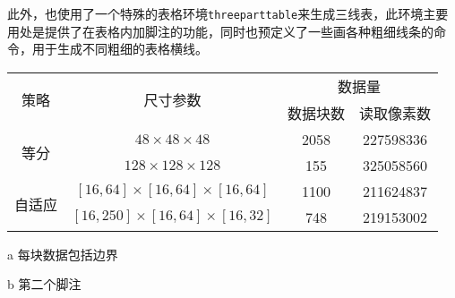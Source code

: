 此外，也使用了一个特殊的表格环境\texttt{threeparttable}来生成三线表，此环境主要用处是提供了在表格内加脚注的功能，同时也预定义了一些画各种粗细线条的命令，用于生成不同粗细的表格横线。

\begin{table}[htbp]
\centering
  \begin{threeparttable}
    \newcommand{\chengs}{\ensuremath{\times}}
    \newcommand{\cheng}{\ensuremath{\!\times\!}}
    \label{tab:samples:threepart}
    \begin{tabular}{cccc} %
      \toprule
  \multirow{2}{*}{策略}   & \multirow{2}{*}{尺寸参数}             & \multicolumn{2}{c}{数据量}    \tabularnewline \cmidrule{3-4}
                         &                                      & 数据块数\tnote{a} & 读取像素数\tnote{b} \tabularnewline \midrule
  \multirow{2}{*}{等分}   & $48\chengs 48\chengs 48$             & 2058             & 227598336 \tabularnewline \cmidrule{2-4} %
                         & $128\chengs 128\chengs 128$          & 155              & 325058560 \tabularnewline \midrule
  \multirow{2}{*}{自适应} & $[16,64]\cheng[16,64]\cheng[16,64]$  & 1100             & 211624837  \tabularnewline \cmidrule{2-4}
                         & $[16,250]\cheng[16,64]\cheng[16,32]$ & 748              & 219153002  \tabularnewline %
      \bottomrule
    \end{tabular}
    \begin{tablenotes}\small
      \item[a] 每块数据包括边界
      \item[b] 第二个脚注
    \end{tablenotes}
  \end{threeparttable}
\end{table}

